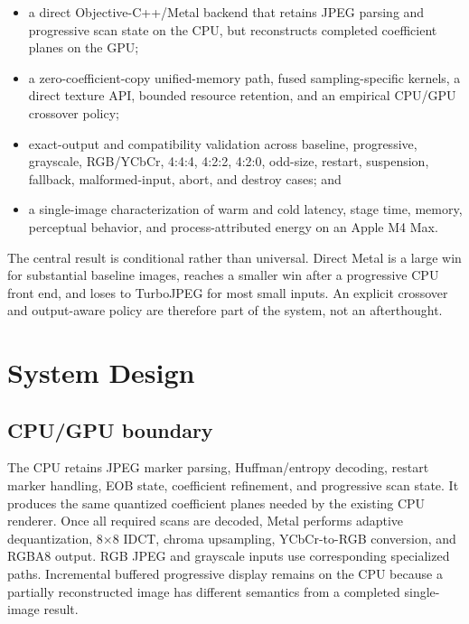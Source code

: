 \documentclass[10pt,twocolumn]{article}
\begin{document}
\begin{itemize}
  \item a direct Objective-C++/Metal backend that retains JPEG parsing and
        progressive scan state on the CPU, but reconstructs completed
        coefficient planes on the GPU;
  \item a zero-coefficient-copy unified-memory path, fused sampling-specific
        kernels, a direct texture API, bounded resource retention, and an
        empirical CPU/GPU crossover policy;
  \item exact-output and compatibility validation across baseline,
        progressive, grayscale, RGB/YCbCr, 4:4:4, 4:2:2, 4:2:0, odd-size,
        restart, suspension, fallback, malformed-input, abort, and destroy
        cases; and
  \item a single-image characterization of warm and cold latency, stage time,
        memory, perceptual behavior, and process-attributed energy on an Apple
        M4 Max.
\end{itemize}

The central result is conditional rather than universal.  Direct Metal is a
large win for substantial baseline images, reaches a smaller win after a
progressive CPU front end, and loses to TurboJPEG for most small inputs.  An
explicit crossover and output-aware policy are therefore part of the system,
not an afterthought.

\section{System Design}
\label{sec:design}

\subsection{CPU/GPU boundary}

The CPU retains JPEG marker parsing, Huffman/entropy decoding, restart marker
handling, EOB state, coefficient refinement, and progressive scan state.  It
produces the same quantized coefficient planes needed by the existing CPU
renderer.  Once all required scans are decoded, Metal performs adaptive
dequantization, 8$\times$8 IDCT, chroma upsampling, YCbCr-to-RGB conversion,
and RGBA8 output.  RGB JPEG and grayscale inputs use corresponding specialized
paths.  Incremental buffered progressive display remains on the CPU because a
partially reconstructed image has different semantics from a completed
single-image result.
\end{document}
